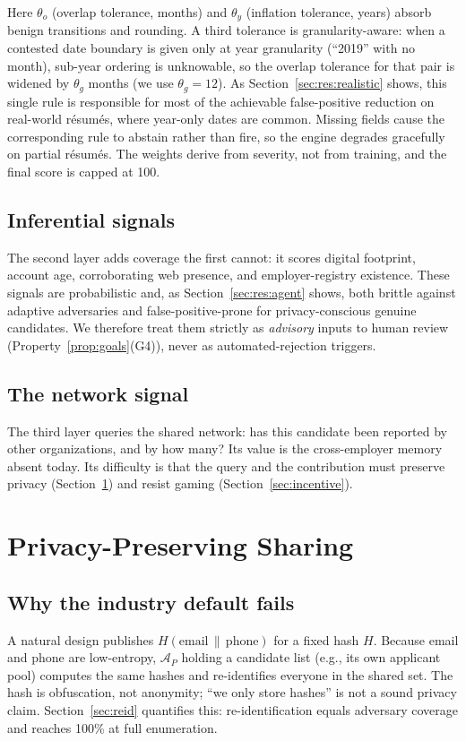 \documentclass[11pt]{article}
\begin{document}
Here $\theta_o$ (overlap tolerance, months) and $\theta_y$ (inflation tolerance,
years) absorb benign transitions and rounding. A third tolerance is
granularity-aware: when a contested date boundary is given only at year
granularity (``2019'' with no month), sub-year ordering is unknowable, so the
overlap tolerance for that pair is widened by $\theta_g$ months (we use
$\theta_g=12$). As Section~\ref{sec:res:realistic} shows, this single rule is
responsible for most of the achievable false-positive reduction on real-world
r\'esum\'es, where year-only dates are common. Missing fields cause the
corresponding rule to abstain rather than fire, so the engine degrades gracefully
on partial r\'esum\'es. The weights derive from severity, not from training, and
the final score is capped at 100.

\subsection{Inferential signals}\label{sec:infer}
The second layer adds coverage the first cannot: it scores digital footprint,
account age, corroborating web presence, and employer-registry existence. These
signals are probabilistic and, as Section~\ref{sec:res:agent} shows, both brittle
against adaptive adversaries and false-positive-prone for privacy-conscious
genuine candidates. We therefore treat them strictly as \emph{advisory} inputs to
human review (Property~\ref{prop:goals}(G4)), never as automated-rejection
triggers.

\subsection{The network signal}\label{sec:netsig}
The third layer queries the shared network: has this candidate been reported by
other organizations, and by how many? Its value is the cross-employer memory
absent today. Its difficulty is that the query and the contribution must preserve
privacy (Section~\ref{sec:privacy}) and resist gaming (Section~\ref{sec:incentive}).

\section{Privacy-Preserving Sharing}\label{sec:privacy}

\subsection{Why the industry default fails}
A natural design publishes $H(\text{email}\,\|\,\text{phone})$ for a fixed hash
$H$. Because email and phone are low-entropy, $\mathcal{A}_P$ holding a candidate
list (e.g., its own applicant pool) computes the same hashes and re-identifies
everyone in the shared set. The hash is obfuscation, not anonymity; ``we only
store hashes'' is not a sound privacy claim. Section~\ref{sec:reid} quantifies
this: re-identification equals adversary coverage and reaches 100\% at full
enumeration.
\end{document}
